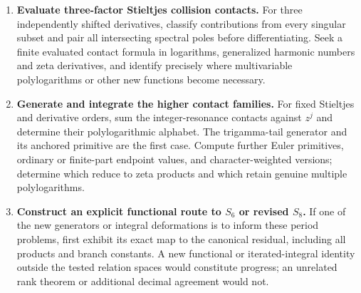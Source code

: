 \begin{enumerate}
\item \textbf{Evaluate three-factor Stieltjes collision contacts.}
For three independently shifted derivatives, classify contributions
from every singular subset and pair all intersecting spectral poles
before differentiating. Seek a finite evaluated contact formula in
logarithms, generalized harmonic numbers and zeta derivatives, and
identify precisely where multivariable polylogarithms or other new
functions become necessary.

\item \textbf{Generate and integrate the higher contact families.}
For fixed Stieltjes and derivative orders, sum the integer-resonance
contacts against $z^j$ and determine their polylogarithmic alphabet.
The trigamma-tail generator and its anchored primitive are the first
case. Compute further Euler primitives, ordinary or finite-part
endpoint values, and character-weighted versions; determine which
reduce to zeta products and which retain genuine multiple
polylogarithms.

\item \textbf{Construct an explicit functional route to $S_6$ or revised
$S_8$.}
If one of the new generators or integral deformations is to inform
these period problems, first exhibit its exact map to the canonical
residual, including all products and branch constants. A new
functional or iterated-integral identity outside the tested relation
spaces would constitute progress; an unrelated rank theorem or
additional decimal agreement would not.
\end{enumerate}
